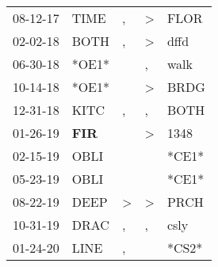\begin{supertabular}{p{0.07\textwidth}p{0.06\textwidth}p{0.02\textwidth}p{0.02\textwidth}p{0.06\textwidth}}
 08-12-17\textsuperscript{} &           TIME\textsuperscript{} &                , &  \textgreater &  FLOR\textsuperscript{} \\
 02-02-18\textsuperscript{} &           BOTH\textsuperscript{} &                , &  \textgreater &  dffd\textsuperscript{} \\
 06-30-18\textsuperscript{} &                            *OE1* &                  &             , &  walk\textsuperscript{} \\
 10-14-18\textsuperscript{} &                            *OE1* &                  &  \textgreater &  BRDG\textsuperscript{} \\
 12-31-18\textsuperscript{} &           KITC\textsuperscript{} &                , &             , &  BOTH\textsuperscript{} \\
 01-26-19\textsuperscript{} &   \textbf{FIR\textsuperscript{}} &                  &  \textgreater &  1348\textsuperscript{} \\
 02-15-19\textsuperscript{} &           OBLI\textsuperscript{} &                  &               &                   *CE1* \\
 05-23-19\textsuperscript{} &           OBLI\textsuperscript{} &                  &               &                   *CE1* \\
 08-22-19\textsuperscript{} &           DEEP\textsuperscript{} &     \textgreater &  \textgreater &  PRCH\textsuperscript{} \\
 10-31-19\textsuperscript{} &           DRAC\textsuperscript{} &                , &             , &  csly\textsuperscript{} \\
 01-24-20\textsuperscript{} &           LINE\textsuperscript{} &                , &               &                   *CS2* \\
\end{supertabular}
